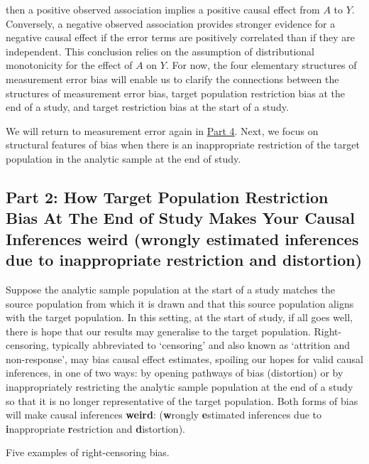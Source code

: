 \documentclass[
  single column]{article}
\begin{document}
then a positive observed association implies a positive causal effect
from \(A\) to \(Y\). Conversely, a negative observed association
provides stronger evidence for a negative causal effect if the error
terms are positively correlated than if they are independent. This
conclusion relies on the assumption of distributional monotonicity for
the effect of \(A\) on \(Y\). For now, the four elementary structures of
measurement error bias will enable us to clarify the connections between
the structures of measurement error bias, target population restriction
bias at the end of a study, and target restriction bias at the start of
a study.

We will return to measurement error again in \hyperref[id-sec-4]{Part
4}. Next, we focus on structural features of bias when there is an
inappropriate restriction of the target population in the analytic
sample at the end of study.

\subsection{\texorpdfstring{Part 2: How Target Population Restriction
Bias At The End of Study Makes Your Causal Inferences weird
(\textbf{w}rongly \textbf{e}stimated inferences due to
\textbf{i}nappropriate \textbf{r}estriction and
\textbf{d}istortion)}{Part 2: How Target Population Restriction Bias At The End of Study Makes Your Causal Inferences weird (wrongly estimated inferences due to inappropriate restriction and distortion)}}\label{id-sec-2}

Suppose the analytic sample population at the start of a study matches
the source population from which it is drawn and that this source
population aligns with the target population. In this setting, at the
start of study, if all goes well, there is hope that our results may
generalise to the target population. Right-censoring, typically
abbreviated to `censoring' and also known as `attrition and
non-response', may bias causal effect estimates, spoiling our hopes for
valid causal inferences, in one of two ways: by opening pathways of bias
(distortion) or by inappropriately restricting the analytic sample
population at the end of a study so that it is no longer representative
of the target population. Both forms of bias will make causal inferences
\textbf{weird}: (\textbf{w}rongly \textbf{e}stimated inferences due to
\textbf{i}nappropriate \textbf{r}estriction and \textbf{d}istortion).

\begin{table}

\caption{\label{tbl-terminologycensoring}Five examples of
right-censoring bias.}

\centering{

\terminologycensoring

}

\end{table}%
\end{document}

